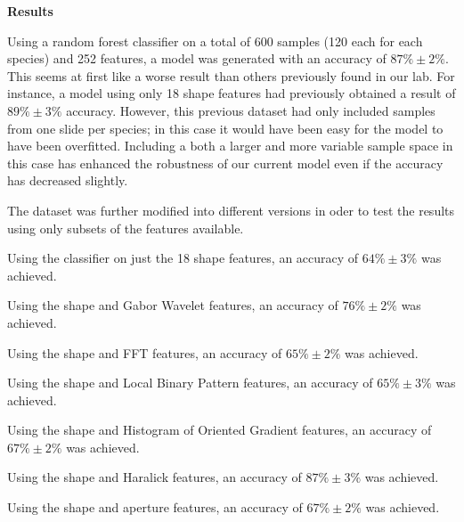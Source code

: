 \textbf{Results}

Using a random forest classifier on a total of 600 samples (120 each for each species) and 252 features, a model was generated with an accuracy of $87\% \pm 2\%$. This seems at first like a worse result than others previously found in our lab. For instance, a model using only 18 shape features had previously obtained a result of $89\% \pm 3\%$ accuracy. However, this previous dataset had only included samples from one slide per species; in this case it would have been easy for the model to have been overfitted. Including a both a larger and more variable sample space in this case has enhanced the robustness of our current model even if the accuracy has decreased slightly.

The dataset was further modified into different versions in oder to test the results using only subsets of the features available.

Using the classifier on just the 18 shape features, an accuracy of  $64\% \pm 3\%$ was achieved.

Using the shape and Gabor Wavelet features, an accuracy of $76\% \pm 2\%$ was achieved.

Using the shape and FFT features, an accuracy of $65\% \pm 2\%$ was achieved.

Using the shape and Local Binary Pattern features, an accuracy of $65\% \pm 3\%$ was achieved.

Using the shape and Histogram of Oriented Gradient features, an accuracy of $67\% \pm 2\%$ was achieved.

Using the shape and Haralick features, an accuracy of $87\% \pm 3\%$ was achieved.

Using the shape and aperture features, an accuracy of $67\% \pm 2\%$ was achieved.

  
  
  